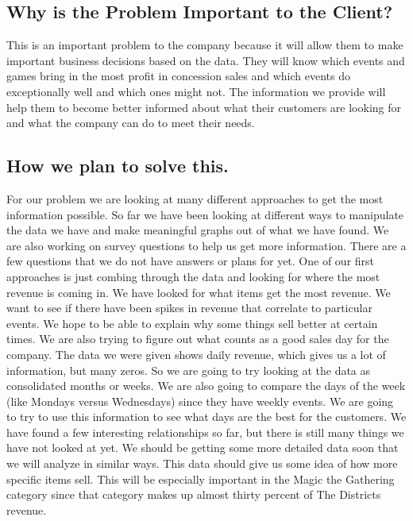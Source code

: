 \documentclass[11pt]{report}
\begin{document}
\subsection*{\hspace{-.5cm} Why is the Problem Important to the
Client?}\label{tech} 
This is an important problem to the company because it will allow them to
make important business decisions based on the data.  They will know which events and games bring in the most profit in concession sales and which events do exceptionally well and which ones might not.  The information we provide will help them to become better informed about what their customers are looking for and what the company can do to meet their needs.



\subsection*{\hspace{-.5cm} How we plan to solve this.}\label{tech}
For our problem we are looking at many different approaches to get the most information possible. So far we have been looking at different ways to manipulate the data we have and make meaningful graphs out of what we have found. We are also working on survey questions to help us get more information. There are a few questions that we do not have answers or plans for yet. 
\newline
One of our first approaches is just combing through the data and looking for where the most revenue is coming in. We have looked for what items get the most revenue.  We want to see if there have been spikes in revenue that correlate to particular events. We hope to be able to explain why some things sell better at certain times.  We are also trying to figure out what counts as a good sales day for the company. 
\newline
The data we were given shows daily revenue, which gives us a lot of information, but many zeros. So we are going to try looking at the data as consolidated months or weeks. We are also going to compare the days of the week (like Mondays versus Wednesdays) since they have weekly events. We are going to try to use this information to see what days are the best for the customers. We have found a few interesting relationships so far, but there is still many things we have not looked at yet.  
\newline
We should be getting some more detailed data soon that we will analyze in similar ways.  This data should give us some idea of how more specific items sell.  This will be especially important in the Magic the Gathering category since that category makes up almost thirty percent of The Districts revenue.  
\end{document}
